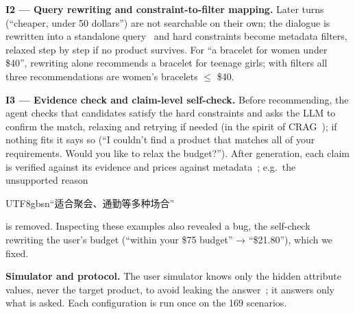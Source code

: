 \documentclass[10pt,a4paper,twocolumn]{article}
\newcommand{\zh}[1]{\begin{CJK}{UTF8}{gbsn}#1\end{CJK}}
\newcommand{\zh}[1]{[Chinese text]}
\newcommand{\zh}[1]{{\zhfont #1}}
\begin{document}
\textbf{I2 — Query rewriting and constraint-to-filter mapping.} Later turns (``cheaper, under 50 dollars'') are not searchable on their own; the dialogue is rewritten into a standalone query~\cite{mao2023} and hard constraints become metadata filters, relaxed step by step if no product survives. For ``a bracelet for women under \$40'', rewriting alone recommends a bracelet for teenage girls; with filters all three recommendations are women's bracelets $\leq$ \$40.

\textbf{I3 — Evidence check and claim-level self-check.} Before recommending, the agent checks that candidates satisfy the hard constraints and asks the LLM to confirm the match, relaxing and retrying if needed (in the spirit of CRAG~\cite{yan2024}); if nothing fits it says so (``I couldn't find a product that matches all of your requirements. Would you like to relax the budget?''). After generation, each claim is verified against its evidence and prices against metadata~\cite{dhuliawala2024}; e.g.\ the unsupported reason \zh{“适合聚会、通勤等多种场合”} is removed. Inspecting these examples also revealed a bug, the self-check rewriting the user's budget (``within your \$75 budget'' → ``\$21.80''), which we fixed.

\textbf{Simulator and protocol.} The user simulator knows only the hidden attribute values, never the target product, to avoid leaking the answer~\cite{zhu2024}; it answers only what is asked. Each configuration is run once on the 169 scenarios.
\end{document}
